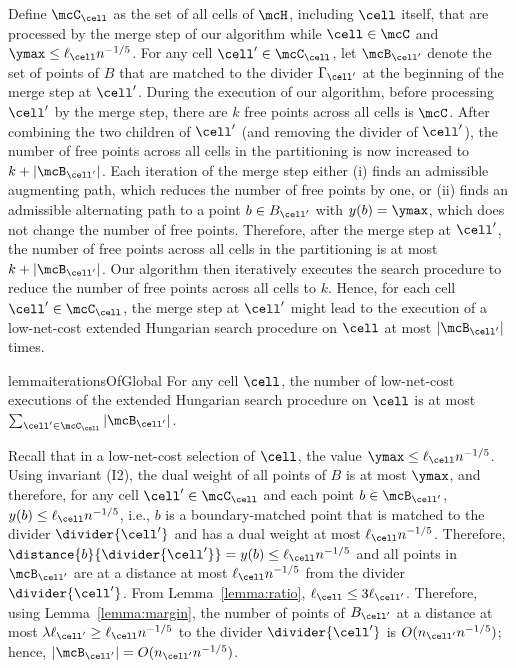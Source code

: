 Define $\mcC_\cell$ as the set of all cells of $\mcH$, including $\cell$ itself, that are processed by the merge step of our algorithm while $\cell\in\mcC$ and $\ymax\le \ell_\cell n^{-1/5}$. For any cell $\cell'\in\mcC_\cell$, let $\mcB_{\cell'}$ denote the set of points of $B$ that are matched to the divider $\Gamma_{\cell'}$ at the beginning of the merge step at $\cell'$. During the execution of our algorithm, before processing $\cell'$ by the merge step, there are $k$ free points across all cells is $\mcC$. After combining the two children of $\cell'$ (and removing the divider of $\cell'$), the number of free points across all cells in the partitioning is now increased to $k + |\mcB_{\cell'}|$. Each iteration of the merge step either (i) finds an admissible augmenting path, which reduces the number of free points by one, or (ii) finds an admissible alternating path to a point $b\in B_{\cell'}$ with $y(b)=\ymax$, which does not change the number of free points. Therefore, after the merge step at $\cell'$, the number of free points across all cells in the partitioning is at most $k + |\mcB_{\cell'}|$. Our algorithm then iteratively executes the search procedure to reduce the number of free points across all cells to $k$. Hence, for each cell $\cell'\in\mcC_\cell$, the merge step at $\cell'$ might lead to the execution of a low-net-cost extended Hungarian search procedure on $\cell$ at most $|\mcB_{\cell'}|$ times.

\begin{restatable}{lemma}{iterationsOfGlobal}\label{lemma:global-iterations}
    For any cell $\cell$, the number of low-net-cost executions of the extended Hungarian search procedure on $\cell$ is at most $\sum_{\cell'\in\mcC_\cell} |\mcB_{\cell'}|$.
\end{restatable}

Recall that in a low-net-cost selection of $\cell$, the value $\ymax\le \ell_\cell n^{-1/5}$. Using invariant (I2), the dual weight of all points of $B$ is at most $\ymax$, and therefore, for any cell $\cell'\in\mcC_{\cell}$ and each point $b\in \mcB_{\cell'}$, $y(b)\le \ell_\cell n^{-1/5}$, i.e., $b$ is a boundary-matched point that is matched to the divider $\divider{\cell'}$ and has a dual weight at most $\ell_\cell n^{-1/5}$. Therefore, $\distance{b}{\divider{\cell'}} = y(b) \le \ell_\cell n^{-1/5}$ and all points in $\mcB_{\cell'}$ are at a distance at most $\ell_\cell n^{-1/5}$ from the divider $\divider{\cell'}$. From Lemma~\ref{lemma:ratio}, $\ell_{\cell}\le 3\ell_{\cell'}$. Therefore, using Lemma~\ref{lemma:margin}, the number of points of $B_{\cell'}$ at a distance at most $\lambda\ell_{\cell'}\ge \ell_\cell n^{-1/5}$ to the divider $\divider{\cell'}$ is $O(n_{\cell'}n^{-1/5})$; hence, $|\mcB_{\cell'}| = O(n_{\cell'}n^{-1/5})$.

